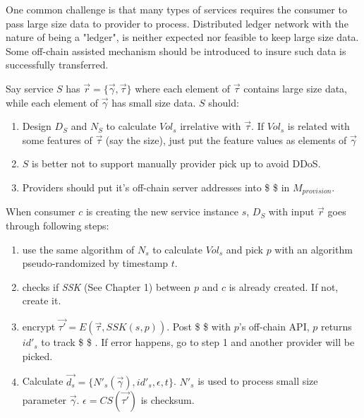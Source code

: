 \documentclass[11pt]{article}
\providecommand{\tightlist}{%
      \setlength{\itemsep}{0pt}\setlength{\parskip}{0pt}}
\begin{document}
One common challenge is that many types of services requires the
consumer to pass large size data to provider to process. Distributed
ledger network with the nature of being a "ledger", is neither expected
nor feasible to keep large size data. Some off-chain assisted mechanism
should be introduced to insure such data is successfully transferred.

Say service \(S\) has \(\vec{r} = \{\vec{\gamma},\vec{\tau}\}\) where
each element of \(\vec{\tau}\) contains large size data, while each
element of \(\vec{\gamma}\) has small size data. \(S\) should:

\begin{enumerate}
\def\labelenumi{\arabic{enumi}.}
\tightlist
\item
  Design \(D_S\) and \(N_S\) to calculate \(Vol_s\) irrelative with
  \(\vec{\tau}\). If \(Vol_s\) is related with some features of
  \(\vec{\tau}\) (say the size), just put the feature values as elements
  of \(\vec{\gamma}\)
\item
  \(S\) is better not to support manually provider pick up to avoid
  DDoS.
\item
  Providers should put it's off-chain server addresses into
  \$ \$ in \(M_{provision}\).
\end{enumerate}

When consumer \(c\) is creating the new service instance \(s\), \(D_S\)
with input \(\vec{r}\) goes through following steps:

\begin{enumerate}
\def\labelenumi{\arabic{enumi}.}
\tightlist
\item
  use the same algorithm of \(N_s\) to calculate \(Vol_s\) and pick
  \(p\) with an algorithm pseudo-randomized by timestamp \(t\).\\
\item
  checks if \emph{SSK} (See Chapter 1) between \(p\) and \(c\) is
  already created. If not, create it.
\item
  encrypt \(\vec{\tau'} = E(\vec{\tau}, SSK(s,p))\). Post \$
  \$ with \(p\)'s off-chain API, \(p\) returns \(id'_s\) to track \$
   \$ . If error happens, go to step 1 and another provider
  will be picked.
\item
  Calculate \(\vec{d_s} = \{N'_s(\vec{\gamma}), id'_s, \epsilon, t\}\).
  \(N'_s\) is used to process small size parameter \(\vec{\gamma}\).
  \(\epsilon = CS(\vec{\tau'})\) is checksum.
\end{enumerate}
\end{document}
